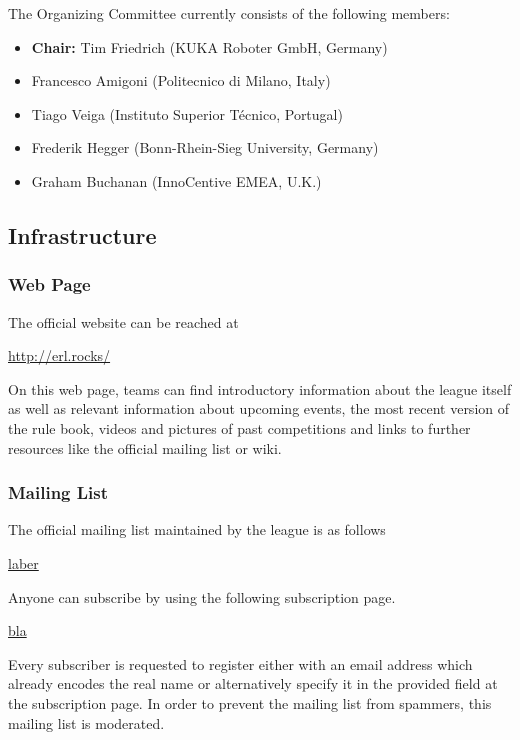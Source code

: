 The Organizing Committee currently consists of the following members:
%
\begin{itemize}	\topsep-12pt\itemsep-2pt
\item \textbf{Chair:} Tim Friedrich (KUKA Roboter GmbH, Germany)
\item Francesco Amigoni (Politecnico di Milano, Italy)
\item Tiago Veiga (Instituto Superior T\'ecnico, Portugal)
\item Frederik Hegger (Bonn-Rhein-Sieg University, Germany)
\item Graham Buchanan (InnoCentive EMEA, U.K.)
\end{itemize}
%

\subsection{\erlir Infrastructure}
\label{ssec:RoawInfrastrcuture}

\subsubsection{\erlir Web Page}
\label{sssec:RoawWeb}

The official \erlir website can be reached at
%
\begin{flushleft}
	\hspace*{1cm}\url{http://erl.rocks/} 
\end{flushleft}
%
On this web page, teams can find introductory information about the league itself as well as relevant information about upcoming events, the most recent version of the rule book, videos and pictures of past competitions and links to further resources like the official mailing list or wiki. 


\subsubsection{\erlir Mailing List}
\label{sssec:RoawMailingList}

The official \erlir mailing list maintained by the league is as follows
%
\begin{flushleft}
	\hspace*{1cm}\url{laber} 
\end{flushleft}
%
Anyone can subscribe by using the following subscription page.
%
\begin{flushleft}
	\hspace*{1cm}\url{bla}\\ 
\end{flushleft}
%
Every subscriber is requested to register either with an email address which already encodes the real name or alternatively specify it in the provided field at the subscription page. In order to prevent the mailing list from spammers, this mailing list is moderated. 

